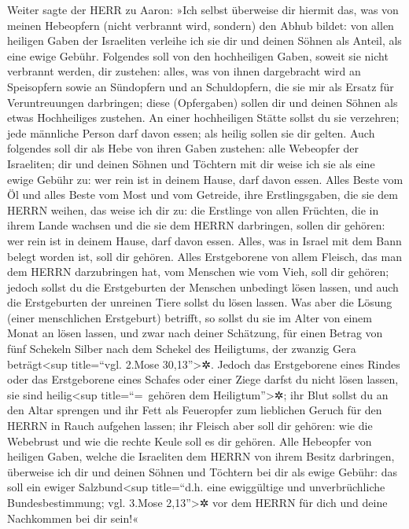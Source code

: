 Weiter sagte der HERR zu Aaron: »Ich selbst überweise dir
hiermit das, was von meinen Hebeopfern (nicht verbrannt wird, sondern)
den Abhub bildet: von allen heiligen Gaben der Israeliten verleihe ich
sie dir und deinen Söhnen als Anteil, als eine ewige Gebühr.
Folgendes soll von den hochheiligen Gaben, soweit sie
nicht verbrannt werden, dir zustehen: alles, was von ihnen dargebracht
wird an Speisopfern sowie an Sündopfern und an Schuldopfern, die sie mir
als Ersatz für Veruntreuungen darbringen; diese (Opfergaben) sollen dir
und deinen Söhnen als etwas Hochheiliges zustehen. An
einer hochheiligen Stätte sollst du sie verzehren; jede männliche Person
darf davon essen; als heilig sollen sie dir gelten. Auch
folgendes soll dir als Hebe von ihren Gaben zustehen: alle Webeopfer der
Israeliten; dir und deinen Söhnen und Töchtern mit dir weise ich sie als
eine ewige Gebühr zu: wer rein ist in deinem Hause, darf davon essen.
Alles Beste vom Öl und alles Beste vom Most und vom
Getreide, ihre Erstlingsgaben, die sie dem HERRN weihen, das weise ich
dir zu: die Erstlinge von allen Früchten, die in ihrem
Lande wachsen und die sie dem HERRN darbringen, sollen dir gehören: wer
rein ist in deinem Hause, darf davon essen. Alles, was in
Israel mit dem Bann belegt worden ist, soll dir gehören.
Alles Erstgeborene von allem Fleisch, das man dem HERRN
darzubringen hat, vom Menschen wie vom Vieh, soll dir gehören; jedoch
sollst du die Erstgeburten der Menschen unbedingt lösen lassen, und auch
die Erstgeburten der unreinen Tiere sollst du lösen lassen.
Was aber die Lösung (einer menschlichen Erstgeburt)
betrifft, so sollst du sie im Alter von einem Monat an lösen lassen, und
zwar nach deiner Schätzung, für einen Betrag von fünf Schekeln Silber
nach dem Schekel des Heiligtums, der zwanzig Gera beträgt\textless sup
title=``vgl. 2.Mose 30,13''\textgreater✲. Jedoch das
Erstgeborene eines Rindes oder das Erstgeborene eines Schafes oder einer
Ziege darfst du nicht lösen lassen, sie sind heilig\textless sup
title=``=~gehören dem Heiligtum''\textgreater✲; ihr Blut sollst du an
den Altar sprengen und ihr Fett als Feueropfer zum lieblichen Geruch für
den HERRN in Rauch aufgehen lassen; ihr Fleisch aber soll
dir gehören: wie die Webebrust und wie die rechte Keule soll es dir
gehören. Alle Hebeopfer von heiligen Gaben, welche die
Israeliten dem HERRN von ihrem Besitz darbringen, überweise ich dir und
deinen Söhnen und Töchtern bei dir als ewige Gebühr: das soll ein ewiger
Salzbund\textless sup title=``d.h. eine ewiggültige und unverbrüchliche
Bundesbestimmung; vgl. 3.Mose 2,13''\textgreater✲ vor dem HERRN für dich
und deine Nachkommen bei dir sein!«

